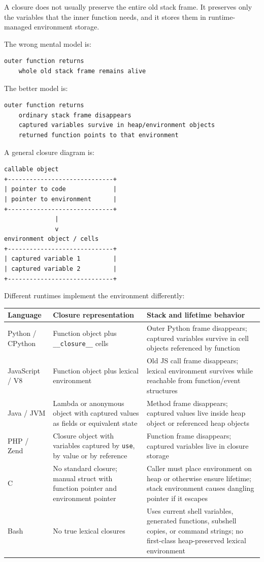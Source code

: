 \documentclass[a4paper,twoside]{report}
\begin{document}
A closure does not usually preserve the entire old stack frame. It preserves only the variables that the inner function needs, and it stores them in runtime-managed environment storage.

The wrong mental model is:

\begin{verbatim}
outer function returns
    whole old stack frame remains alive
\end{verbatim}

The better model is:

\begin{verbatim}
outer function returns
    ordinary stack frame disappears
    captured variables survive in heap/environment objects
    returned function points to that environment
\end{verbatim}

A general closure diagram is:

\begin{verbatim}
callable object
+-----------------------------+
| pointer to code             |
| pointer to environment      |
+-----------------------------+
              |
              v
environment object / cells
+-----------------------------+
| captured variable 1         |
| captured variable 2         |
+-----------------------------+
\end{verbatim}

Different runtimes implement the environment differently:

\begin{center}
\begin{tabular}{|p{}|p{}|p{}|}
\hline
\textbf{Language} & \textbf{Closure representation} & \textbf{Stack and lifetime behavior} \\
\hline
Python / CPython & Function object plus \texttt{\_\_closure\_\_} cells & Outer Python frame disappears; captured variables survive in cell objects referenced by function \\
\hline
JavaScript / V8 & Function object plus lexical environment & Old JS call frame disappears; lexical environment survives while reachable from function/event structures \\
\hline
Java / JVM & Lambda or anonymous object with captured values as fields or equivalent state & Method frame disappears; captured values live inside heap object or referenced heap objects \\
\hline
PHP / Zend & Closure object with variables captured by \texttt{use}, by value or by reference & Function frame disappears; captured variables live in closure storage \\
\hline
C & No standard closure; manual struct with function pointer and environment pointer & Caller must place environment on heap or otherwise ensure lifetime; stack environment causes dangling pointer if it escapes \\
\hline
Bash & No true lexical closures & Uses current shell variables, generated functions, subshell copies, or command strings; no first-class heap-preserved lexical environment \\
\hline
\end{tabular}
\end{center}
\end{document}
